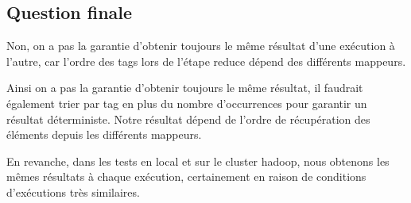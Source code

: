 \documentclass[a4paper, 11pt, titlepage]{article}
\begin{document}
\subsection* {Question finale}

Non, on a pas la garantie d'obtenir toujours le même résultat d'une exécution à l'autre, car l'ordre des tags lors de l'étape reduce dépend des différents mappeurs.

Ainsi on a pas la garantie d'obtenir toujours le même résultat, il faudrait également trier par tag en plus du nombre d'occurrences pour garantir un résultat déterministe. Notre résultat dépend de l'ordre de récupération des éléments depuis les différents mappeurs.

En revanche, dans les tests en local et sur le cluster hadoop, nous obtenons les mêmes résultats à chaque exécution, certainement en raison de conditions d'exécutions très similaires.
\end{document}
